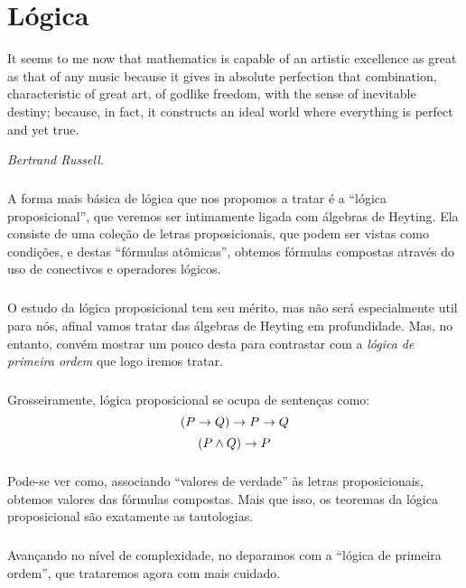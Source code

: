 \chapter{Lógica}
    \epigraph{\justify
        It seems to me now that mathematics 
        is capable of an artistic excellence 
        as great as that of any music 
        \elide because it gives in absolute 
        perfection that combination, 
        characteristic of great art, of godlike 
        freedom, with the sense of inevitable 
        destiny; because, in fact, it constructs 
        an ideal world where everything is 
        perfect and yet true.
        }{\textit{Bertrand Russell.}}    
    \cls
    \paragraph{}
        A forma mais básica de lógica que nos propomos
        a tratar é a ``lógica proposicional'', que 
        veremos ser intimamente ligada com álgebras de
        Heyting. Ela consiste de uma coleção de letras
        proposicionais, que podem ser vistas como 
        condições, e destas ``fórmulas atômicas'', 
        obtemos fórmulas compostas através do uso de 
        conectivos e operadores lógicos.
    \paragraph{}
        O estudo da lógica proposicional tem seu 
        mérito, mas não será especialmente util para
        nós, afinal vamos tratar das álgebras de 
        Heyting em profundidade. Mas, no entanto, 
        convém mostrar um pouco desta para contrastar
        com a {\em lógica de primeira ordem} que logo
        iremos tratar.
    \paragraph{}
        Grosseiramente, lógica proposicional se ocupa
        de sentenças como:
        $$(P\rightarrow Q)\rightarrow P\rightarrow Q$$
        $$(P\land Q)\rightarrow P$$
    \paragraph{}
        Pode-se ver como, associando ``valores de 
        verdade'' às letras proposicionais, obtemos
        valores das fórmulas compostas. Mais que isso,
        os teoremas da lógica proposicional são 
        exatamente as tautologias.
    \paragraph{}
        Avançando no nível de complexidade, no 
        deparamos com a ``lógica de primeira ordem'',
        que trataremos agora com mais cuidado.

